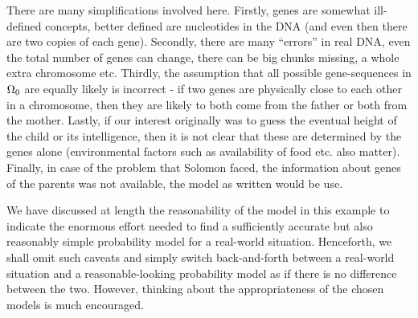 \documentclass[preprint,  11pt]{amsart}
\begin{document}
 There are many simplifications involved here. Firstly, genes are somewhat ill-defined concepts, better defined are nucleotides in the DNA (and even then there are two copies of each gene). Secondly, there are many ``errors'' in real DNA, even the total number of genes can change, there can be big chunks missing, a whole extra chromosome etc. Thirdly, the assumption that all possible gene-sequences in $\Omega_{0}$ are equally likely is incorrect - if two genes are physically close to each other in a chromosome, then they are likely to both come from the father or both from the mother. Lastly, if our interest originally was to guess the eventual height of the child or its intelligence, then it is not clear that these are determined by the genes alone (environmental factors such as availability of food etc. also matter). Finally, in case of the problem that Solomon faced, the information about genes of the parents was not available, the model as written would be use.
\eeg

\berk We have discussed at length the reasonability of the model in this example to indicate the enormous effort needed to find a sufficiently  accurate but also reasonably simple probability model for a real-world situation. Henceforth, we shall omit such caveats and simply switch back-and-forth between a real-world situation and a reasonable-looking probability model as if there is no difference between the two. However, thinking about the appropriateness of the chosen models is much encouraged.
\eerk

\end{document}
